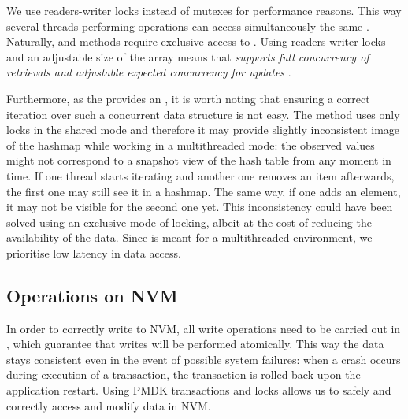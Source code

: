     We use readers-writer locks instead of mutexes for performance reasons. This way several threads performing \getMethod operations can access simultaneously the same \internalHashMap. Naturally, \insertMethod and \removeMethod methods require exclusive access to \internalHashMap. Using readers-writer locks and an adjustable size of the \internalHashMap array means that \PHT \emph{supports full concurrency of retrievals and adjustable expected concurrency for updates} \cite{ConcurrentHashMapJava}. 
    
    Furthermore, as the \NvmHashMap provides an \Iterator, it is worth noting that ensuring a correct iteration over such a concurrent data structure is not easy. The \iterateMethod method uses only locks in the shared mode and therefore it may provide slightly inconsistent image of the hashmap while working in a multithreaded mode: the observed values might not correspond to a snapshot view of the hash table from any moment in time. If one thread starts iterating and another one removes an item afterwards, the first one may still see it in a hashmap. The same way, if one adds an element, it may not be visible for the second one yet. This inconsistency could have been solved using an exclusive mode of locking, albeit at the cost of reducing the availability of the data. Since \PHT is meant for a multithreaded environment, we prioritise low latency in data access.

\subsection{Operations on NVM}

    In order to correctly write to NVM, all write operations need to be carried out in \pmdktransactions, which guarantee that writes will be performed atomically. 
    This way the data stays consistent even in the event of possible system failures: when a crash occurs during execution of a transaction, the transaction is rolled back upon the application restart. Using PMDK transactions and locks allows us to safely and correctly access and modify data in NVM.

